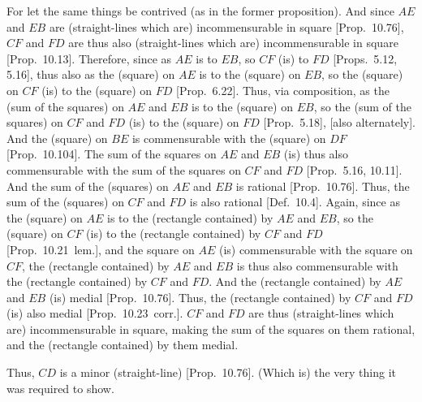 \begin{Parallel}{}{}
{For let the same things be contrived (as in the former proposition).
And since $AE$ and $EB$ are (straight-lines which are) incommensurable in square [Prop.~10.76], $CF$ and $FD$ are thus also
(straight-lines which are)  incommensurable in square [Prop.~10.13].
Therefore, since as $AE$ is to $EB$, so $CF$ (is) to $FD$ [Props.~5.12, 5.16], thus also
as the (square) on $AE$ is to the (square) on $EB$, so the (square)
on $CF$ (is) to the (square) on $FD$ [Prop.~6.22]. Thus, via composition,
as the (sum of the squares) on $AE$ and $EB$ is to the (square) on $EB$,
so the (sum of the squares) on $CF$ and $FD$  (is) to the (square) on $FD$  [Prop.~5.18], [also alternately]. And the
(square) on $BE$ is commensurable with the (square) on $DF$ [Prop.~10.104]. The sum of the squares on $AE$ and $EB$ (is) thus also commensurable with the sum of the squares
on $CF$ and $FD$ [Prop.~5.16, 10.11].  And the sum of the (squares) on
$AE$ and $EB$ is rational [Prop.~10.76].
Thus, the sum of the (squares) on $CF$ and $FD$ is also rational
[Def.~10.4]. Again, since as the (square) on $AE$
is to the (rectangle contained) by $AE$ and $EB$, so
the (square) on $CF$ (is) to the (rectangle contained) by
$CF$ and $FD$ [Prop.~10.21~lem.],
and the square on $AE$ (is) commensurable with the square on
$CF$, the (rectangle contained) by $AE$ and $EB$ is thus also commensurable
with the (rectangle contained) by $CF$ and $FD$. And the
(rectangle contained) by $AE$ and $EB$ (is) medial [Prop.~10.76].  Thus, the (rectangle contained) by
$CF$ and $FD$ (is) also medial [Prop.~10.23~corr.]. $CF$ and $FD$
are thus (straight-lines which are) incommensurable in square, making the sum of the
squares on them rational, and the (rectangle contained) by them
medial.

Thus, $CD$ is a minor (straight-line) [Prop.~10.76]. (Which is) the very thing it
was required to show.}
\end{Parallel}

